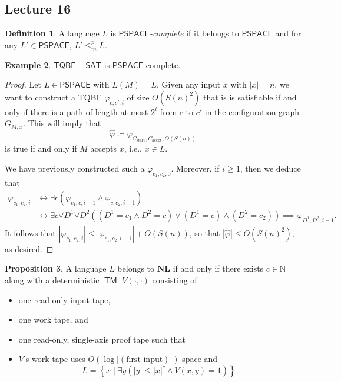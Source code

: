 \documentclass[10pt,letterpaper,cm]{nupset}
\theoremstyle{definition}
\newtheorem{definition}{Definition}[subsection]
\newtheorem{exmp}[definition]{Example}
\theoremstyle{theorem}
\newtheorem{prop}[definition]{Proposition}
\theoremstyle{remark}
\newcommand{\N}{\mathbb N}
\newcommand{\1}{\mathbf{1}}
\newcommand{\accpt}{\mathrm{accpt}}
\newcommand{\0}{\vec 0}
\DeclareMathOperator{\TM}{\mathsf{TM}}
\begin{document}
\subsection{Lecture 16}

\begin{definition}
A language $L$ is \textit{$\mathsf{PSPACE}$-complete} if it belongs to $\mathsf{PSPACE}$ and for any $L' \in \mathsf{PSPACE}$, $L' \leq_m^p L$.
\end{definition}

\begin{exmp}
$\mathsf{TQBF{-}SAT} $ is $\mathsf{PSPACE}$-complete.
\end{exmp}
\begin{proof}
Let $L \in \mathsf{PSPACE}$ with $L(M) = L$. Given any input $x$ with $\left\lvert{x}\right\rvert =n$, we want to construct a TQBF $\varphi_{c, c', i}$ of size $O(S(n)^2)$ that is is satisfiable if and only if there is a path of length at most $2^i$ from $c$ to $c'$ in the configuration graph $G_{M,x}$. This will imply that $$\hat{\varphi}\coloneqq \varphi_{C_{\mathrm{start}}, C_{\accpt}, O(S(n))}$$ is true if and only if $M$ accepts $x$, i.e.,  $x\in L$.


 We have previously constructed such a $\varphi_{c_1, c_2, 0}$. Moreover, if $i\geq 1$, then we deduce that 
\begin{align*}
\varphi_{c_1, c_2, i} & \leftrightarrow \exists c\left(\varphi_{c_1, c, i-1} \land \varphi_{c, c_2, i-1}\right)
\\ & \leftrightarrow \exists c \forall D^1 \forall D^2\left(\left(D^1 = c_1 \land D^2 = c\right) \vee \left(D^1 = c\right) \land \left(D^2 = c_2\right)\right) \implies \varphi_{D^1, D^2, i-1}.
\end{align*}
It follows that $\left\lvert{\varphi_{c_1, c_2, i}}\right\rvert\leq \left\lvert{\varphi_{c_1, c_2, i-1}}\right\rvert +O(S(n))$, so that $\left\lvert{\hat{\varphi}}\right\rvert \leq O(S(n)^2)$, as desired.
\end{proof}

\begin{prop}
A language $L$ belongs to $\mathbf{NL}$ if and only if there exists $c\in \N$ along with a deterministic $\TM$ $V(\cdot, \cdot)$ consisting of 
\begin{itemize}
\item one read-only input tape, 
\item one work tape, and 
\item one read-only, single-axis proof tape  such that 
\item $V$'s work tape uses $O(\log{\left\lvert{\left(\text{first input}\right)}\right\rvert})$ space and $$L = \left\{ x \mid \exists y\left(\left\lvert{y}\right\rvert \leq \left\lvert{x}\right\rvert^{c} \land V\left(x,y\right) = 1\right)\right\}.$$ 
\end{itemize}
\end{prop}
\end{document}
